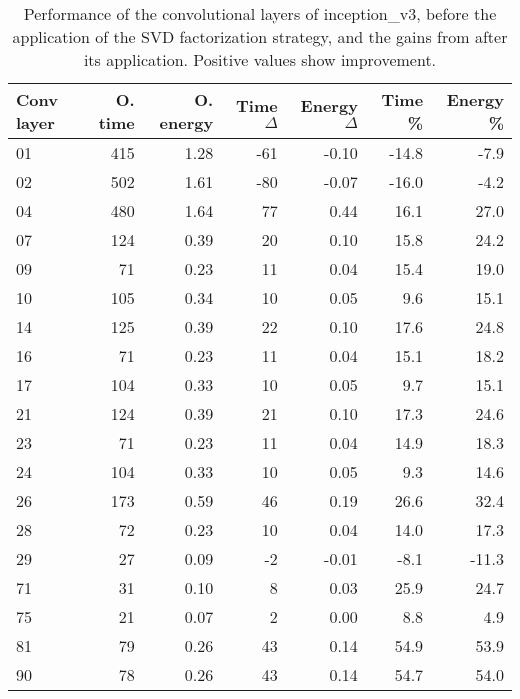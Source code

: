 \begin{table}
\centering
\begin{tabular}{|l|r|r|r|r|r|r|}
\hline
Conv layer & O. time & O. energy & Time $\Delta$ & Energy $\Delta$ & Time \% & Energy \% \\\hline
01 & 415 & 1.28 & -61 & -0.10 & -14.8 & -7.9 \\\hline
02 & 502 & 1.61 & -80 & -0.07 & -16.0 & -4.2 \\\hline
04 & 480 & 1.64 & 77 & 0.44 & 16.1 & 27.0 \\\hline
07 & 124 & 0.39 & 20 & 0.10 & 15.8 & 24.2 \\\hline
09 & 71 & 0.23 & 11 & 0.04 & 15.4 & 19.0 \\\hline
10 & 105 & 0.34 & 10 & 0.05 & 9.6 & 15.1 \\\hline
14 & 125 & 0.39 & 22 & 0.10 & 17.6 & 24.8 \\\hline
16 & 71 & 0.23 & 11 & 0.04 & 15.1 & 18.2 \\\hline
17 & 104 & 0.33 & 10 & 0.05 & 9.7 & 15.1 \\\hline
21 & 124 & 0.39 & 21 & 0.10 & 17.3 & 24.6 \\\hline
23 & 71 & 0.23 & 11 & 0.04 & 14.9 & 18.3 \\\hline
24 & 104 & 0.33 & 10 & 0.05 & 9.3 & 14.6 \\\hline
26 & 173 & 0.59 & 46 & 0.19 & 26.6 & 32.4 \\\hline
28 & 72 & 0.23 & 10 & 0.04 & 14.0 & 17.3 \\\hline
29 & 27 & 0.09 & -2 & -0.01 & -8.1 & -11.3 \\\hline
71 & 31 & 0.10 & 8 & 0.03 & 25.9 & 24.7 \\\hline
75 & 21 & 0.07 & 2 & 0.00 & 8.8 & 4.9 \\\hline
81 & 79 & 0.26 & 43 & 0.14 & 54.9 & 53.9 \\\hline
90 & 78 & 0.26 & 43 & 0.14 & 54.7 & 54.0 \\\hline
\end{tabular}
\caption{Performance of the convolutional layers of inception\_v3, before the application of the SVD factorization strategy, and the gains from after its application. Positive values show improvement.}
\label{inception_v3-performance}
\end{table}
